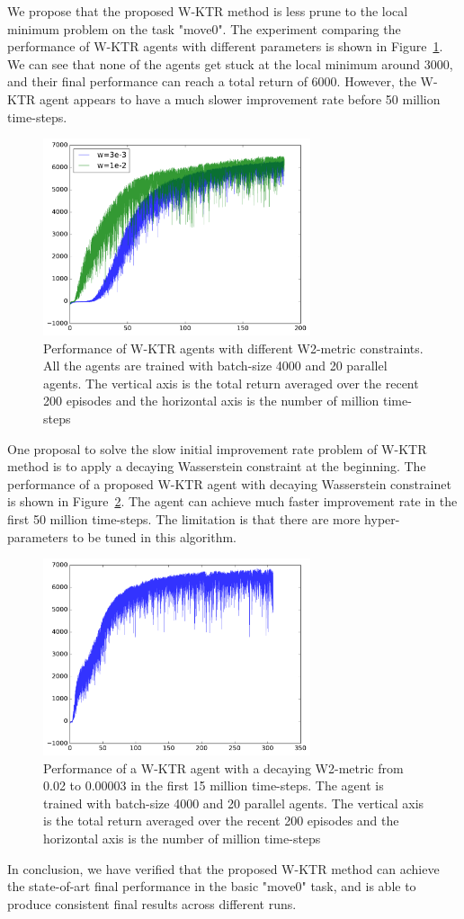 We propose that the proposed W-KTR method is less prune to the local minimum problem on the task "move0". The experiment comparing the performance of W-KTR agents with different parameters is shown in Figure~\ref{fig_wass_const_tune}. We can see that none of the agents get stuck at the local minimum around 3000, and their final performance can reach a total return of 6000. However, the W-KTR agent appears to have a much slower improvement rate before 50 million time-steps.
\begin{figure}[!htbp]
	\includegraphics[width=0.7\textwidth]{images/rec_wass_const_tune}
	\centering
	\caption{Performance of W-KTR agents with different W2-metric constraints. All the agents are trained with batch-size 4000 and 20 parallel agents. The vertical axis is the total return averaged over the recent 200 episodes and the horizontal axis is the number of million time-steps}\label{fig_wass_const_tune}
\end{figure}

One proposal to solve the slow initial improvement rate problem of W-KTR method is to apply a decaying Wasserstein constraint at the beginning. The performance of a proposed W-KTR agent with decaying Wasserstein constrainet is shown in Figure~\ref{fig_wass_decay}. The agent can achieve much faster improvement rate in the first 50 million time-steps. The limitation is that there are more hyper-parameters to be tuned in this algorithm.
\begin{figure}[!htbp]
	\includegraphics[width=0.7\textwidth]{images/rec_wass_decay}
	\centering
	\caption{Performance of a W-KTR agent with a decaying W2-metric from 0.02 to 0.00003 in the first 15 million time-steps. The agent is trained with batch-size 4000 and 20 parallel agents. The vertical axis is the total return averaged over the recent 200 episodes and the horizontal axis is the number of million time-steps}\label{fig_wass_decay}
\end{figure}

In conclusion, we have verified that the proposed W-KTR method can achieve the state-of-art final performance in the basic "move0" task, and is able to produce consistent final results across different runs.